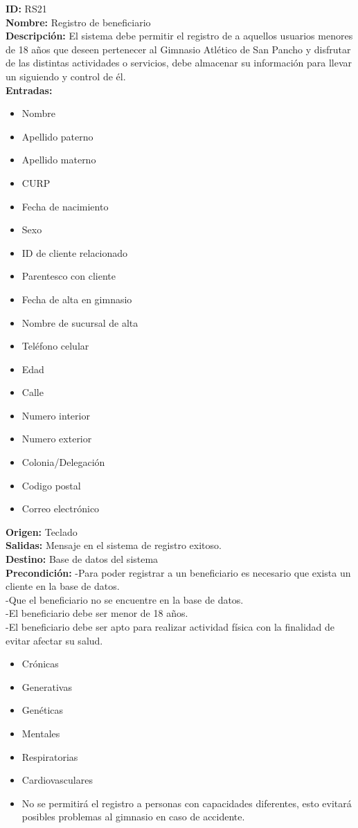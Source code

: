 \textbf{ID:} RS21\\
\textbf{Nombre:} Registro de beneficiario\\
\textbf{Descripción:} El sistema debe permitir el registro de a aquellos usuarios menores de 18 años que deseen pertenecer al Gimnasio Atlético de San Pancho y disfrutar de las distintas actividades o servicios, debe almacenar su información para llevar un siguiendo y control de él.\\

\textbf{Entradas: }
        \begin{itemize}
         \item Nombre
         \item Apellido paterno
         \item Apellido materno
         \item CURP
         \item Fecha de nacimiento
         \item Sexo
         \item ID de cliente relacionado
         \item Parentesco con cliente
         \item Fecha de alta en gimnasio
         \item Nombre de sucursal de alta 
         \item Teléfono celular
         \item Edad 
         \item Calle 
         \item Numero interior 
         \item Numero exterior 
         \item Colonia/Delegación
         \item Codigo postal
         \item Correo electrónico
\end{itemize}
\textbf{Origen:} Teclado\\
\textbf{Salidas:} Mensaje en el sistema de registro exitoso.\\
\textbf{Destino:} Base de datos del sistema\\
\textbf{Precondición: }
-Para poder registrar a un beneficiario es necesario que exista un cliente en la base de datos.\\ 
-Que el beneficiario no se encuentre en la base de datos.\\
-El beneficiario debe ser menor de 18 años.\\
-El beneficiario debe ser apto para realizar actividad física con la finalidad de evitar  afectar su salud.\\
\begin{itemize}
	\item Crónicas
	\item Generativas
	\item Genéticas
	\item Mentales
	\item Respiratorias
	\item Cardiovasculares
	\item No se permitirá el registro a personas con capacidades diferentes, esto evitará posibles problemas al gimnasio en caso de accidente.
\end{itemize}

